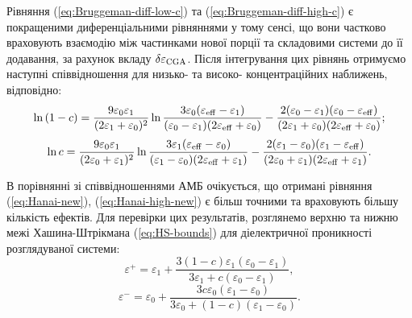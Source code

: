 \documentclass[14pt,twoside]{vakthesis}
\begin{document}
Рівняння (\ref{eq:Bruggeman-diff-low-c}) та (\ref{eq:Bruggeman-diff-high-c}) є покращеними диференціальними рівняннями у тому сенсі, що вони частково враховують взаємодію між частинками нової порції та складовими системи до її додавання, за рахунок вкладу $\delta\varepsilon_{\rm CGA}$. Після інтегрування цих рівнянь отримуємо наступні співвідношення для низько- та високо- концентраційних наближень, відповідно:
\begin{equation}\label{eq:Hanai-new}
\begin{split}
\ln{(1-c)} = \frac{9 \varepsilon_0 \varepsilon_1}{(2\varepsilon_1 + \varepsilon_0)^2} \ln{ \frac{3\varepsilon_0 (\varepsilon_{\rm eff} - \varepsilon_1)}{(\varepsilon_0 - \varepsilon_1) (2\varepsilon_{\rm eff} + \varepsilon_0)} }
- \frac{2(\varepsilon_0 - \varepsilon_1) (\varepsilon_0 - \varepsilon_{\rm eff})}{(2\varepsilon_1 + \varepsilon_0) (2\varepsilon_{\rm eff} + \varepsilon_0)};
\end{split}
\end{equation}
\begin{equation}\label{eq:Hanai-high-new}
\ln{c} = \frac{9 \varepsilon_0 \varepsilon_1}{(2\varepsilon_0 + \varepsilon_1)^2} \ln{ \frac{3\varepsilon_1 (\varepsilon_{\rm eff} - \varepsilon_0)}{(\varepsilon_1 - \varepsilon_0) (2\varepsilon_{\rm eff} + \varepsilon_1)} }
- \frac{2(\varepsilon_1 - \varepsilon_0) (\varepsilon_1 - \varepsilon_{\rm eff})}{(2\varepsilon_0 + \varepsilon_1) (2\varepsilon_{\rm eff} + \varepsilon_1)}.
\end{equation}



В порівнянні зі співвідношеннями АМБ очікується, що отримані рівняння (\ref{eq:Hanai-new}), (\ref{eq:Hanai-high-new}) є більш точними та враховують більшу кількість ефектів. Для перевірки цих результатів, розглянемо верхню та нижню межі Хашина-Штрікмана (\ref{eq:HS-bounds}) для діелектричної проникності розглядуваної системи:
\begin{equation}\label{eq:HS-upper}
\varepsilon^{+} = \varepsilon_1 + \frac{3(1 - c)\varepsilon_1 (\varepsilon_0 - \varepsilon_1)}{3\varepsilon_1 + c
	(\varepsilon_0 - \varepsilon_1)},
\end{equation}
\begin{equation}\label{eq:HS-lower}
\varepsilon^{-} = \varepsilon_0 + \frac{3c\varepsilon_0 (\varepsilon_1 - \varepsilon_0)}{3\varepsilon_0 + (1-c) (\varepsilon_1 - \varepsilon_0)}.
\end{equation}
\end{document}
